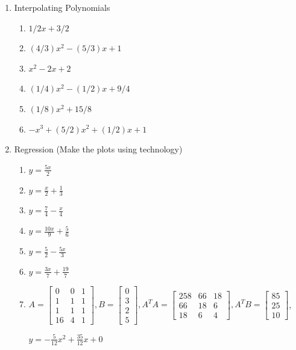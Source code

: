 {\begin{multicols}{2}
\begin{enumerate}
\item Interpolating Polynomials
\begin{enumerate}
\item $1/2 x + 3/2$
\item $(4/3)x^2-(5/3)x+1$
\item $x^2-2x+2$
\item $(1/4)x^2-(1/2)x+9/4$
\item $(1/8)x^2+15/8$
\item $-x^3+(5/2)x^2+(1/2)x+1$
\end{enumerate}


\item Regression (Make the plots using technology)
\begin{enumerate}
\item $y=\frac{5 x}{2}$
\item $y=\frac{x}{2}+\frac{1}{3}$
\item $y=\frac{7}{4}-\frac{x}{4}$
\item $y=\frac{10 x}{9}+\frac{5}{6}$
\item $y=\frac{5}{2}-\frac{5 x}{3}$
\item $y=\frac{3 x}{7}+\frac{19}{7}$
\item 
$
A=
\begin{bmatrix} 
 0 & 0 & 1 \\
 1 & 1 & 1 \\
 1 & 1 & 1 \\
 16 & 4 & 1
\end{bmatrix},
B=
\begin{bmatrix} 
 0 \\
 3 \\
 2 \\
 5
\end{bmatrix},
A^T A=
\begin{bmatrix} 
 258 & 66 & 18 \\
 66 & 18 & 6 \\
 18 & 6 & 4
\end{bmatrix},
A^T B=
\begin{bmatrix} 
 85 \\
 25 \\
 10
\end{bmatrix}$,

$y=-\frac{5}{12}x^2+\frac{35}{12}x+0
$
\end{enumerate}







\end{enumerate}
\end{multicols}}
